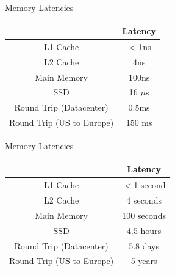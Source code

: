 \documentclass[12pt, aspectration=169]{beamer}
\begin{document}
    \begin{frame}{Memory Latencies}
        \begin{center}
            \begin{tabular}{|c c|}
             \hline
              & Latency \\ [0.5ex]
             \hline\hline
             L1 Cache & $<$1ns \\
             \hline
             L2 Cache & 4ns \\
             \hline
             Main Memory & 100ns \\
             \hline
             SSD & 16 $\mu$s \\ [1ex]
             \hline
             Round Trip (Datacenter)   & 0.5ms     \\
             \hline
             Round Trip (US to Europe) & 150 ms \\ [1ex]
             \hline
            \end{tabular}
        \end{center}
    \end{frame}

    \begin{frame}{Memory Latencies}
        \begin{center}
            \begin{tabular}{|c c|}
             \hline
              & Latency \\ [0.5ex]
             \hline\hline
             L1 Cache & $<$1 second \\
             \hline
             L2 Cache & 4 seconds \\
             \hline
             Main Memory & 100 seconds \\
             \hline
             SSD & 4.5 hours \\ [1ex]
             \hline
             Round Trip (Datacenter)   & 5.8 days     \\
             \hline
             Round Trip (US to Europe) & 5 years \\ [1ex]
             \hline
            \end{tabular}
        \end{center}
    \end{frame}
\end{document}

